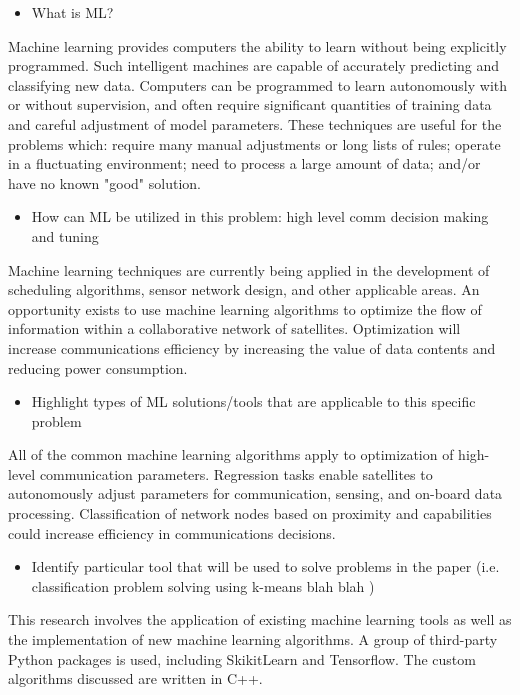 \documentclass[11pt]{article}
\begin{document}
\begin{itemize}
\item What is ML?
\end{itemize}

Machine learning provides computers the ability to learn without being
explicitly programmed.  Such intelligent machines are capable of accurately
predicting and classifying new data.  Computers can be programmed to learn
autonomously with or without supervision, and often require significant
quantities of training data and careful adjustment of model parameters.  These
techniques are useful for the problems which: require many manual adjustments or
long lists of rules; operate in a fluctuating environment; need to process a
large amount of data; and/or have no known "good" solution.

\begin{itemize}
\item How can ML be utilized in this problem: high level comm decision making and
tuning
\end{itemize}

Machine learning techniques are currently being applied in the development of
scheduling algorithms, sensor network design, and other applicable areas.  An
opportunity exists to use machine learning algorithms to optimize the flow of
information within a collaborative network of satellites.  Optimization will
increase communications efficiency by increasing the value of data contents and
reducing power consumption.

\begin{itemize}
\item Highlight types of ML solutions/tools that are applicable to this specific
problem
\end{itemize}

All of the common machine learning algorithms apply to optimization of
high-level communication parameters.  Regression tasks enable satellites to
autonomously adjust parameters for communication, sensing, and on-board data
processing.  Classification of network nodes based on proximity and capabilities
could increase efficiency in communications decisions.

\begin{itemize}
\item Identify particular tool that will be used to solve problems in the paper
(i.e. classification problem solving using k-means blah blah )
\end{itemize}

This research involves the application of existing machine learning tools as
well as the implementation of new machine learning algorithms.  A group of
third-party Python packages is used, including SkikitLearn and Tensorflow.
The custom algorithms discussed are written in C++.
\end{document}
